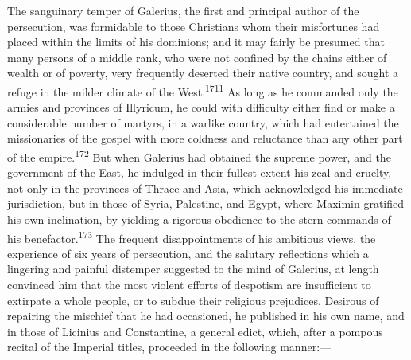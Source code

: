 The sanguinary temper of Galerius, the first and principal author
of the persecution, was formidable to those Christians whom their
misfortunes had placed within the limits of his dominions; and it
may fairly be presumed that many persons of a middle rank, who
were not confined by the chains either of wealth or of poverty,
very frequently deserted their native country, and sought a
refuge in the milder climate of the West.\textsuperscript{1711} As long as he
commanded only the armies and provinces of Illyricum, he could
with difficulty either find or make a considerable number of
martyrs, in a warlike country, which had entertained the
missionaries of the gospel with more coldness and reluctance than
any other part of the empire.\textsuperscript{172} But when Galerius had obtained
the supreme power, and the government of the East, he indulged in
their fullest extent his zeal and cruelty, not only in the
provinces of Thrace and Asia, which acknowledged his immediate
jurisdiction, but in those of Syria, Palestine, and Egypt, where
Maximin gratified his own inclination, by yielding a rigorous
obedience to the stern commands of his benefactor.\textsuperscript{173} The
frequent disappointments of his ambitious views, the experience
of six years of persecution, and the salutary reflections which a
lingering and painful distemper suggested to the mind of
Galerius, at length convinced him that the most violent efforts
of despotism are insufficient to extirpate a whole people, or to
subdue their religious prejudices. Desirous of repairing the
mischief that he had occasioned, he published in his own name,
and in those of Licinius and Constantine, a general edict, which,
after a pompous recital of the Imperial titles, proceeded in the
following manner:—



